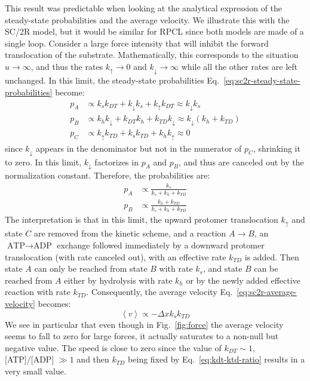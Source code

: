     This result was predictable when looking at the analytical expression of the steady-state probabilities and the average velocity. We illustrate this with the SC/2R model, but it would be similar for RPCL since both models are made of a single loop. Consider a large force intensity that will inhibit the forward translocation of the substrate. Mathematically, this corresponds to the situation $u \rightarrow \infty$, and thus the rates $k_\uparrow \rightarrow 0$ and $k_\downarrow \rightarrow\infty$ while all the other rates are left unchanged. In this limit, the steady-state probabilities Eq.~\eqref{eq:sc2r-steady-state-probabilities} become:
    \begin{equation}
    \begin{split}
        p_A &\propto k_s k_{DT} + k_\downarrow k_s + k_\uparrow k_{DT} 
            \approx k_\downarrow k_s \\
        p_B &\propto k_h k_\downarrow + k_{DT} k_h + k_{TD} k_\downarrow 
            \approx k_\downarrow (k_h + k_{TD}) \\
        p_C &\propto k_\uparrow k_{TD} + k_s k_{TD} + k_h k_\uparrow
            \approx 0
    \end{split}
    \end{equation}
    since $k_\downarrow$ appears in the denominator but not in the numerator of $p_C$, shrinking it to zero. In this limit, $k_\downarrow$ factorizes in $p_A$ and $p_B$, and thus are canceled out by the normalization constant. Therefore, the probabilities are:
    \begin{equation}
    \begin{split}
        p_A &\propto \frac{k_s}{k_s + k_h + k_{TD}} \\
        p_B &\propto \frac{k_h + k_{TD}}{k_s + k_h + k_{TD}}
    \end{split}
    \end{equation}
    The interpretation is that in this limit, the upward protomer translocation $k_\uparrow$ and state $C$ are removed from the kinetic scheme, and a reaction $A\to B$, an $\text{ATP}\to\text{ADP}$ exchange followed immediately by a downward protomer translocation (with rate canceled out), with an effective rate $k_{TD}$ is added. Then state $A$ can only be reached from state $B$ with rate $k_s$, and state $B$ can be reached from $A$ either by hydrolysis with rate $k_h$ or by the newly added effective reaction with rate $k_{TD}$. Consequently, the average velocity Eq.~\eqref{eq:sc2r-average-velocity} becomes:
    \begin{equation}
        \left\langle v \right\rangle \propto - \Delta x k_s k_{TD}
    \end{equation}
    We see in particular that even though in Fig.~\ref{fig:force} the average velocity seems to fall to zero for large forces, it actually saturates to a non-null but negative value. The speed is close to zero since the value of $k_{DT} \sim 1$, [ATP]/[ADP] $\gg 1$ and then $k_{TD}$ being fixed by Eq.~\eqref{eq:kdt-ktd-ratio} results in a very small value.
    
